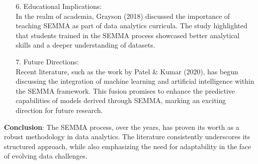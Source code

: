 \documentclass{article}
\begin{document}
\begin{itemize}
\item[6.]Educational Implications: \\In the realm of academia, Grayson (2018) discussed the importance of teaching SEMMA as part of data analytics curricula. The study highlighted that students trained in the SEMMA process showcased better analytical skills and a deeper understanding of datasets.
\item[7.]Future Directions:\\ Recent literature, such as the work by Patel \& Kumar (2020), has begun discussing the integration of machine learning and artificial intelligence within the SEMMA framework. This fusion promises to enhance the predictive capabilities of models derived through SEMMA, marking an exciting direction for future research.

\end{itemize}

\textbf{Conclusion}: The SEMMA process, over the years, has proven its worth as a robust methodology in data analytics. The literature consistently underscores its structured approach, while also emphasizing the need for adaptability in the face of evolving data challenges.
\end{document}
